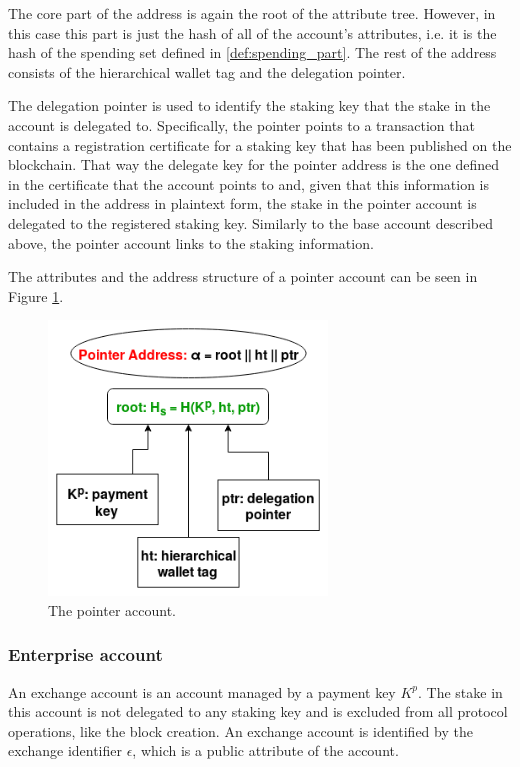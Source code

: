 The core part of the address is again the root of the attribute tree. However, in this case this part is just the hash of all of the account's attributes, i.e. it is the hash of the spending set defined in \ref{def:spending_part}. The rest of the address consists of the hierarchical wallet tag and the delegation pointer.

The delegation pointer is used to identify the staking key that the stake in the account is delegated to. Specifically, the pointer points to a transaction that contains a registration certificate for a staking key that has been published on the blockchain. That way the delegate key for the pointer address is the one defined in the certificate that the account points to and, given that this information is included in the address in plaintext form, the stake in the pointer account is delegated to the registered staking key. Similarly to the base account described above, the pointer account links to the staking information.

The attributes and the address structure of a pointer account can be seen in Figure \ref{fig:pointer_account}.

\begin{figure}
  \begin{center}
    \includegraphics[width=210pt]{pointer_account.png}
  \end{center}
  \caption{The pointer account.}
  \label{fig:pointer_account}
\end{figure}

\subsubsection{Enterprise account}\label{subsubsec:exchange_account_plain}

An exchange account is an account managed by a payment key $K^p$. The stake in this account is not delegated to any staking key and is excluded from all protocol operations, like the block creation. An exchange account is identified by the exchange identifier $\epsilon$, which is a public attribute of the account.

